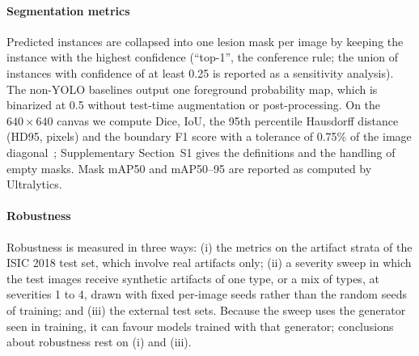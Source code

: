 \paragraph{Segmentation metrics}
Predicted instances are collapsed into one lesion mask per image by keeping the instance with the highest confidence (``top-1'', the conference rule; the union of instances with confidence of at least 0.25 is reported as a sensitivity analysis). The non-YOLO baselines output one foreground probability map, which is binarized at 0.5 without test-time augmentation or post-processing. On the $640\times640$ canvas we compute Dice, IoU, the 95th percentile Hausdorff distance (HD95, pixels) and the boundary F1 score with a tolerance of 0.75\% of the image diagonal~\cite{csurka2013bf}; Supplementary Section~S1 gives the definitions and the handling of empty masks. Mask mAP50 and mAP50--95 are reported as computed by Ultralytics.

\paragraph{Robustness}
Robustness is measured in three ways: (i) the metrics on the artifact strata of the ISIC 2018 test set, which involve real artifacts only; (ii) a severity sweep in which the test images receive synthetic artifacts of one type, or a mix of types, at severities 1 to 4, drawn with fixed per-image seeds rather than the random seeds of training; and (iii) the external test sets. Because the sweep uses the generator seen in training, it can favour models trained with that generator; conclusions about robustness rest on (i) and (iii).

